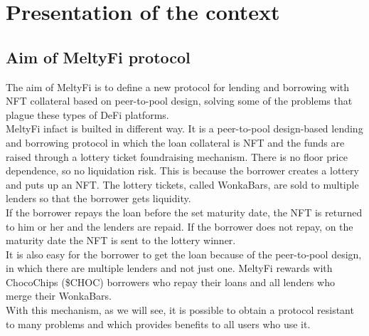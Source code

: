 \section{Presentation of the context}\label{sec:presentationOfTheContext}

\subsection{Aim of MeltyFi protocol}
The aim of MeltyFi is to define a new protocol for lending and borrowing with NFT collateral based on peer-to-pool design, solving some of the problems that plague these types of DeFi platforms.
\\
\indent MeltyFi infact is builted in different way. It is a peer-to-pool design-based lending and borrowing protocol in which the loan collateral is NFT and the funds are raised through a lottery ticket foundraising mechanism. There is no floor price dependence, so no liquidation risk. This is because the borrower creates a lottery and puts up an NFT. The lottery tickets, called WonkaBars, are sold to multiple lenders so that the borrower gets liquidity.
\\
\indent If the borrower repays the loan before the set maturity date, the NFT is returned to him or her and the lenders are repaid. If the borrower does not repay, on the maturity date the NFT is sent to the lottery winner.
\\
\indent It is also easy for the borrower to get the loan because of the peer-to-pool design, in which there are multiple lenders and not just one. MeltyFi rewards with ChocoChips (\$CHOC) borrowers who repay their loans and all lenders who merge their WonkaBars.
\\
\indent With this mechanism, as we will see, it is possible to obtain a protocol resistant to many problems and which provides benefits to all users who use it.

